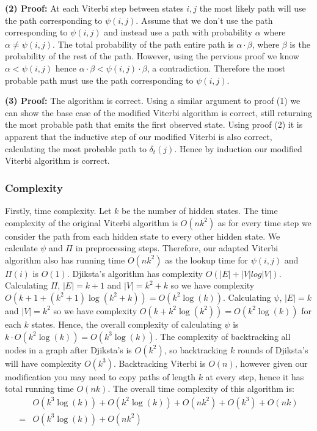 \textbf{(2) Proof:} At each Viterbi step between states $i,j$ the most likely path will use the path corresponding to $\psi(i,j)$. Assume that we don't use the path corresponding to $\psi(i,j)$ and instead use a path with probability $\alpha$ where $\alpha \neq \psi(i,j)$. The total probability of the path entire path is $\alpha \cdot \beta$, where $\beta$ is the probability of the rest of the path. However, using the pervious proof we know $\alpha < \psi(i,j)$ hence $\alpha \cdot \beta < \psi(i,j) \cdot \beta$, a contradiction. Therefore the most probable path must use the path corresponding to $\psi(i,j)$. 

\textbf{(3) Proof:} The algorithm is correct. Using a similar argument to proof (1) we can show the base case of the modified Viterbi algorithm is correct, still returning the most probable path that emits the first observed state. Using proof (2) it is apparent that the inductive step of our modified Viterbi is also correct, calculating the most probable path to $\delta_t(j)$. Hence by induction our modified Viterbi algorithm is correct.  



\subsubsection*{Complexity}
Firstly, time complexity. Let $k$ be the number of hidden states. The time complexity of the original Viterbi algorithm is $O(nk^2)$ as for every time step we consider the path from each hidden state to every other hidden state. We calculate $\psi$ and $\Pi$ in preprocessing steps. Therefore, our adapted Viterbi algorithm also has running time $O(nk^2)$ as the lookup time for $\psi(i,j)$ and $\Pi(i)$ is $O(1)$. Djiksta's algorithm has complexity $O(|E|+|V|log|V|)$. Calculating $\Pi$, $|E| = k+1$ and $|V| = k^2 + k$ so we have complexity $O(k+1 + (k^2+1) \log(k^2+k)) = O(k^2 \log(k))$. Calculating $\psi$, $|E| = k$ and $|V| = k^2$ so we have complexity $O(k + k^2 \log(k^2)) = O(k^2 \log(k))$ for each $k$ states. Hence, the overall complexity of calculating $\psi$ is $k\cdot O(k^2 \log(k)) = O(k^3 \log(k))$. The complexity of backtracking all nodes in a graph after Djiksta's is $O(k^2)$, so backtracking $k$ rounds of Djiksta's will have complexity $O(k^3)$. Backtracking Viterbi is $O(n)$, however given our modification you may need to copy paths of length $k$ at every step, hence it has total running time $O(nk)$. The overall time complexity of this algorithm is:
\begin{align*}
&O(k^3 \log(k)) + O(k^2 \log(k)) + O(nk^2) + O(k^3) + O(nk)\\
=& O(k^3 \log(k)) + O(nk^2)
\end{align*}

